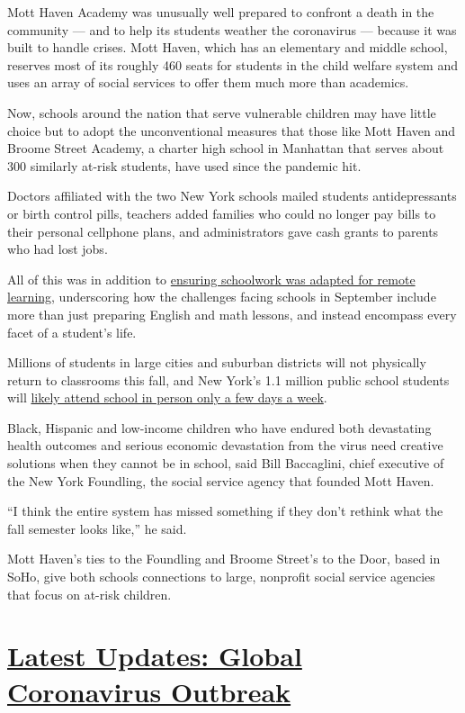 Mott Haven Academy was unusually well prepared to confront a death in
the community --- and to help its students weather the coronavirus ---
because it was built to handle crises. Mott Haven, which has an
elementary and middle school, reserves most of its roughly 460 seats for
students in the child welfare system and uses an array of social
services to offer them much more than academics.

Now, schools around the nation that serve vulnerable children may have
little choice but to adopt the unconventional measures that those like
Mott Haven and Broome Street Academy, a charter high school in Manhattan
that serves about 300 similarly at-risk students, have used since the
pandemic hit.

Doctors affiliated with the two New York schools mailed students
antidepressants or birth control pills, teachers added families who
could no longer pay bills to their personal cellphone plans, and
administrators gave cash grants to parents who had lost jobs.

All of this was in addition to
\href{https://www.nytimes.com/2020/03/29/nyregion/coronavirus-new-york-schools-remote-learning.html}{ensuring
schoolwork was adapted for remote learning}, underscoring how the
challenges facing schools in September include more than just preparing
English and math lessons, and instead encompass every facet of a
student's life.

Millions of students in large cities and suburban districts will not
physically return to classrooms this fall, and New York's 1.1 million
public school students will
\href{https://www.nytimes.com/2020/07/08/nyregion/nyc-schools-reopening-plan.html}{likely
attend school in person only a few days a week}.

Black, Hispanic and low-income children who have endured both
devastating health outcomes and serious economic devastation from the
virus need creative solutions when they cannot be in school, said Bill
Baccaglini, chief executive of the New York Foundling, the social
service agency that founded Mott Haven.

``I think the entire system has missed something if they don't rethink
what the fall semester looks like,'' he said.

Mott Haven's ties to the Foundling and Broome Street's to the Door,
based in SoHo, give both schools connections to large, nonprofit social
service agencies that focus on at-risk children.

\hypertarget{latest-updates-global-coronavirus-outbreak}{%
\section{\texorpdfstring{\href{https://www.nytimes.com/2020/08/01/world/coronavirus-covid-19.html?action=click\&pgtype=Article\&state=default\&region=MAIN_CONTENT_1\&context=storylines_live_updates}{Latest
Updates: Global Coronavirus
Outbreak}}{Latest Updates: Global Coronavirus Outbreak}}\label{latest-updates-global-coronavirus-outbreak}}

